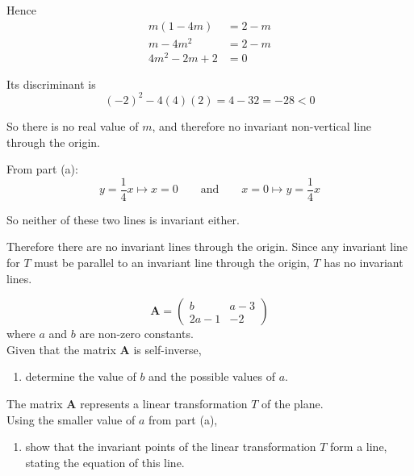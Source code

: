 \documentclass[leqno]{article}
\begin{document}
\begin{enumerate}[
  label=\textbf{\arabic*.},
  leftmargin=*,
  topsep=0pt,
  partopsep=0pt,
  parsep=0pt
]
\begin{djsSolution}
\begin{enumerate}[label=\textbf{(\alph*)}]
Hence
\begin{align*}
m(1-4m)&=2-m\\
m-4m^2&=2-m\\
4m^2-2m+2&=0
\end{align*}

Its discriminant is
\[
(-2)^2-4(4)(2)=4-32=-28<0
\]

So there is no real value of \(m\), and therefore no invariant non-vertical line through the origin.

From part (a):
\[
y=\frac14x \mapsto x=0
\qquad\text{and}\qquad
x=0 \mapsto y=\frac14x
\]

So neither of these two lines is invariant either.

Therefore there are no invariant lines through the origin. Since any invariant line for \(T\) must be parallel to an invariant line through the origin, \(T\) has no invariant lines.
  \end{enumerate}
\end{djsSolution}


\newpage

\questionitem

\[
\mathbf{A} = \begin{pmatrix} b & a - 3 \\[6pt] 2a - 1 & -2 \end{pmatrix}
\]
where $a$ and $b$ are non-zero constants. \\
Given that the matrix $\mathbf{A}$ is self-inverse, \\
\begin{enumerate}[label=\textbf{(\alph*)}]
  \item determine the value of $b$ and the possible values of $a$.  \\
\end{enumerate}
The matrix $\mathbf{A}$ represents a linear transformation $T$ of the plane. \\
Using the smaller value of $a$ from part (a), \\
\begin{enumerate}[label=\textbf{(\alph*)}, resume]
  \item show that the invariant points of the linear transformation $T$ form a line, stating the equation of this line.  \\
\end{enumerate}

\vspace*{10pt}


\end{enumerate}
\end{document}
